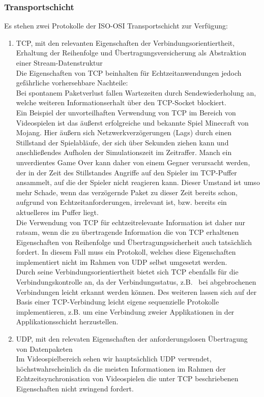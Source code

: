 \documentclass[11pt,twoside,a4paper]{article}
\begin{document}
\subsubsection{Transportschicht}
Es stehen zwei Protokolle der ISO-OSI Transportschicht zur Verfügung:
\begin{enumerate}
\item TCP, mit den relevanten Eigenschaften der Verbindungsorientiertheit, Erhaltung der Reihenfolge und Übertragungsversicherung als Abstraktion einer Stream-Datenstruktur\\
	Die Eigenschaften von TCP beinhalten für Echtzeitanwendungen jedoch gefährliche vorhersehbare Nachteile:\\
	Bei spontanem Paketverlust fallen Wartezeiten durch Sendewiederholung an, welche weiteren Informationserhalt über den TCP-Socket blockiert.\\
Ein Beispiel der unvorteilhaften Verwendung von TCP im Bereich von Videospielen ist das äußerst erfolgreiche und bekannte Spiel Minecraft von Mojang. Hier äußern sich Netzwerkverzögerungen (Lags) durch einen Stillstand der Spielabläufe, der sich über Sekunden ziehen kann und anschließendes Aufholen der Simulationszeit im Zeitraffer. Manch ein unverdientes Game Over kann daher von einem Gegner verursacht werden, der in der Zeit des Stillstandes Angriffe auf den Spieler im TCP-Puffer ansammelt, auf die der Spieler nicht reagieren kann. Dieser Umstand ist umso mehr Schade, wenn das verzögernde Paket zu dieser Zeit bereits schon, aufgrund von Echtzeitanforderungen, irrelevant ist, bzw. bereits ein aktuelleres im Puffer liegt.\\
Die Verwendung von TCP für echtzeitrelevante Information ist daher nur ratsam, wenn die zu übertragende Information die von TCP erhaltenen Eigenschaften von Reihenfolge und Übertragungssicherheit auch tatsächlich fordert. In diesem Fall muss ein Protokoll, welches diese Eigenschaften implementiert nicht im Rahmen von UDP selbst umgesetzt werden.\\
Durch seine Verbindungsorientiertheit bietet sich TCP ebenfalls für die Verbindungskontrolle an, da der Verbindungsstatus, z.B.~ bei abgebrochenen Verbindungen leicht erkannt werden können. Des weiteren lassen sich auf der Basis einer TCP-Verbindung leicht eigene sequenzielle Protokolle implementieren, z.B. um eine Verbindung zweier Applikationen in der Applikationsschicht herzustellen.
\item UDP, mit den relevaten Eigenschaften der anforderungslosen Übertragung von Datenpaketen\\
	Im Videospielbereich sehen wir hauptsächlich UDP verwendet, höchstwahrscheinlich
	da die meisten Informationen im Rahmen der Echtzeitsynchronisation von Videospielen die unter TCP beschriebenen Eigenschaften nicht zwingend fordert.
\end{enumerate}
\end{document}
